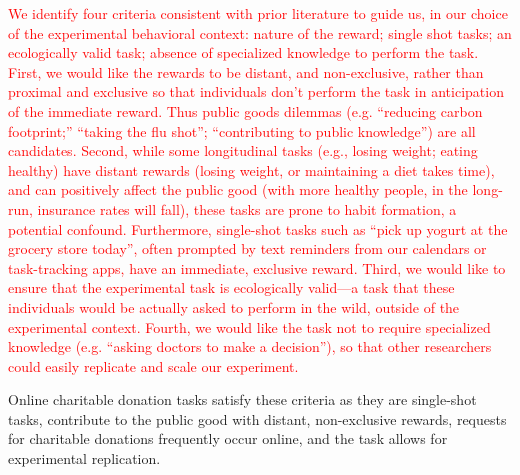 \textcolor{red}{We identify four criteria consistent with prior literature \cite{lee2013does, sussman2015framing,saunders2016no,rumsey2003influence} to guide us, in our choice of the experimental behavioral context: nature of the reward; single shot tasks; an ecologically valid task; absence of specialized knowledge to perform the task. First, we would like the rewards to be distant, and non-exclusive, rather than proximal and exclusive so that individuals don't perform the task in anticipation of the immediate reward. Thus public goods dilemmas (e.g. ``reducing carbon footprint;'' ``taking the flu shot''; ``contributing to public knowledge'') are all candidates. Second, while some longitudinal tasks (e.g., losing weight; eating healthy) have distant rewards (losing weight, or maintaining a diet takes time), and can positively affect the public good (with more healthy people, in the long-run, insurance rates will fall), these tasks are prone to habit formation, a potential confound. Furthermore, single-shot tasks such as ``pick up yogurt at the grocery store today'', often prompted by text reminders from our calendars or task-tracking apps, have an immediate, exclusive reward. Third, we would like to ensure that the experimental task is ecologically valid---a task that these individuals would be actually asked to perform in the wild, outside of the experimental context. Fourth, we would like the task not to require specialized knowledge (e.g. ``asking doctors to make a decision''), so that other researchers could easily replicate and scale our experiment. }


Online charitable donation tasks satisfy these criteria as they are single-shot tasks, contribute to the public good with distant, non-exclusive rewards, requests for charitable donations frequently occur online, and the task allows for experimental replication. 

